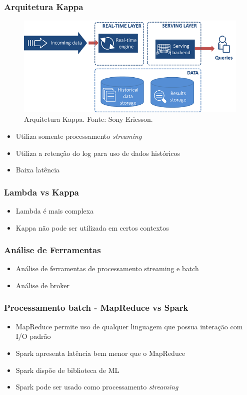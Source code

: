 \documentclass{beamer}
\begin{document}
    \begin{frame}
        \frametitle{Arquitetura Kappa}
        \begin{figure}
            \includegraphics[scale=0.4]{figures/KappaArchitecture.png}
            \caption{Arquitetura Kappa. Fonte: Sony Ericsson.}
        \end{figure}
        \begin{itemize}
            \item Utiliza somente processamento \textit{streaming}
            \item Utiliza a retenção do log para uso de dados históricos
            \item Baixa latência
        \end{itemize}
    \end{frame}

    \begin{frame}
        \frametitle{Lambda vs Kappa}
        \begin{itemize}
            \item Lambda é mais complexa
            \item Kappa não pode ser utilizada em certos contextos
        \end{itemize}
    \end{frame}

  \begin{frame}
      \frametitle{Análise de Ferramentas}
      \begin{itemize}
          \item Análise de ferramentas de processamento streaming e batch
          \item Análise de broker
      \end{itemize}
  \end{frame}

  \begin{frame}
      \frametitle{Processamento batch - MapReduce vs Spark}
      \begin{itemize}
          \item MapReduce permite uso de qualquer linguagem que possua interação
              com I/O padrão
          \item Spark apresenta latência bem menor que o MapReduce
          \item Spark dispõe de biblioteca de ML
          \item Spark pode ser usado como processamento \textit{streaming}
      \end{itemize}
  \end{frame}
\end{document}
